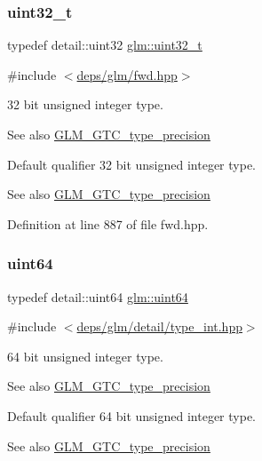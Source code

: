 \subsubsection{\texorpdfstring{uint32\+\_\+t}{uint32\_t}}
{\footnotesize\ttfamily typedef detail\+::uint32 \hyperlink{group__gtc__type__precision_ga822ca53a9ad412504532838906276a99}{glm\+::uint32\+\_\+t}}



{\ttfamily \#include $<$\hyperlink{fwd_8hpp}{deps/glm/fwd.\+hpp}$>$}

32 bit unsigned integer type. \begin{DoxySeeAlso}{See also}
\hyperlink{group__gtc__type__precision}{G\+L\+M\+\_\+\+G\+T\+C\+\_\+type\+\_\+precision}
\end{DoxySeeAlso}
Default qualifier 32 bit unsigned integer type. \begin{DoxySeeAlso}{See also}
\hyperlink{group__gtc__type__precision}{G\+L\+M\+\_\+\+G\+T\+C\+\_\+type\+\_\+precision} 
\end{DoxySeeAlso}


Definition at line 887 of file fwd.\+hpp.

\mbox{\label{group__gtc__type__precision_gae3632bf9b37da66233d78930dd06378a}} 
\subsubsection{\texorpdfstring{uint64}{uint64}}
{\footnotesize\ttfamily typedef detail\+::uint64 \hyperlink{group__gtc__type__precision_gae3632bf9b37da66233d78930dd06378a}{glm\+::uint64}}



{\ttfamily \#include $<$\hyperlink{type__int_8hpp}{deps/glm/detail/type\+\_\+int.\+hpp}$>$}

64 bit unsigned integer type. \begin{DoxySeeAlso}{See also}
\hyperlink{group__gtc__type__precision}{G\+L\+M\+\_\+\+G\+T\+C\+\_\+type\+\_\+precision}
\end{DoxySeeAlso}
Default qualifier 64 bit unsigned integer type. \begin{DoxySeeAlso}{See also}
\hyperlink{group__gtc__type__precision}{G\+L\+M\+\_\+\+G\+T\+C\+\_\+type\+\_\+precision} 
\end{DoxySeeAlso}


